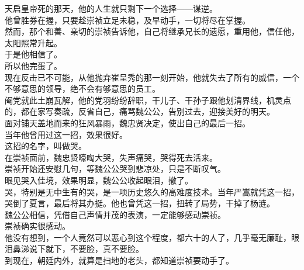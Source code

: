 \begin{multicols}{\theparacolNo}
天启皇帝死的那天，他的人生就只剩下一个选择——谋逆。\\

他曾胜券在握，只要趁崇祯立足未稳，及早动手，一切将尽在掌握。\\

然而，那个和善、亲切的崇祯告诉他，自己将继承兄长的遗愿，重用他，信任他，太阳照常升起。\\

于是他相信了。\\

所以他完蛋了。\\

现在反击已不可能，从他抛弃崔呈秀的那一刻开始，他就失去了所有的威信，一个不够意思的领导，绝不会有够意思的员工。\\

阉党就此土崩瓦解，他的党羽纷纷辞职，干儿子、干孙子跟他划清界线，机灵点的，都在家写奏疏，反省自己，痛骂魏公公，告别过去，迎接美好的明天。\\

面对铺天盖地而来的狂风暴雨，魏忠贤决定，使出自己的最后一招。\\

当年他曾用过这一招，效果很好。\\

这招的名字，叫做哭。\\

在崇祯面前，魏忠贤嚎啕大哭，失声痛哭，哭得死去活来。\\

崇祯开始还安慰几句，等魏公公哭到悲凉处，只是不断叹气。\\

眼见哭入佳境，效果明显，魏公公收起眼泪，撤了。\\

哭，特别是无中生有的哭，是一项历史悠久的高难度技术。当年严嵩就凭这一招，哭倒了夏言，最后将其办挺。他也曾凭这一招，扭转了局势，干掉了杨涟。\\

魏公公相信，凭借自己声情并茂的表演，一定能够感动崇祯。\\

崇祯确实很感动。\\

他没有想到，一个人竟然可以恶心到这个程度，都六十的人了，几乎毫无廉耻，眼泪鼻涕说下就下，不要脸，真不要脸。\\

到现在，朝廷内外，就算是扫地的老头，都知道崇祯要动手了。\\


\end{multicols}
